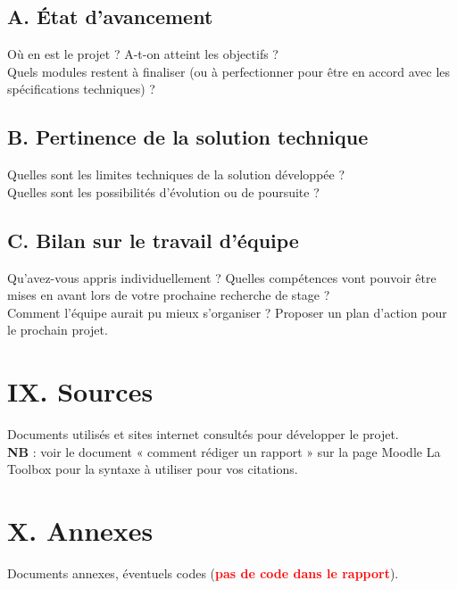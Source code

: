 \documentclass[a4paper,11pt]{book}
\begin{document}
\subsection*{A. État d'avancement}
Où en est le projet ? A-t-on atteint les objectifs ?\\
\noindent Quels modules restent à finaliser (ou à perfectionner pour être en accord avec les spécifications techniques) ?

\subsection*{B. Pertinence de la solution technique}
Quelles sont les limites techniques de la solution développée ? \\
\noindent Quelles sont les possibilités d’évolution ou de poursuite ?


\subsection*{C. Bilan sur le travail d'équipe}
Qu’avez-vous appris individuellement ? Quelles compétences vont pouvoir être mises en avant lors de votre prochaine recherche de stage ?
\\
\noindent Comment l’équipe aurait pu mieux s’organiser ? Proposer un plan d’action pour le prochain projet.



\newpage
\section*{IX. Sources}
Documents utilisés et sites internet consultés pour développer le projet.\\
\noindent \textbf{NB} : voir le document « comment rédiger un rapport » sur la page Moodle La Toolbox pour la syntaxe à utiliser pour vos citations.



\newpage
\section*{X. Annexes}
Documents annexes, éventuels codes (\textbf{\textcolor{red}{pas de code dans le rapport}}).
\end{document}
